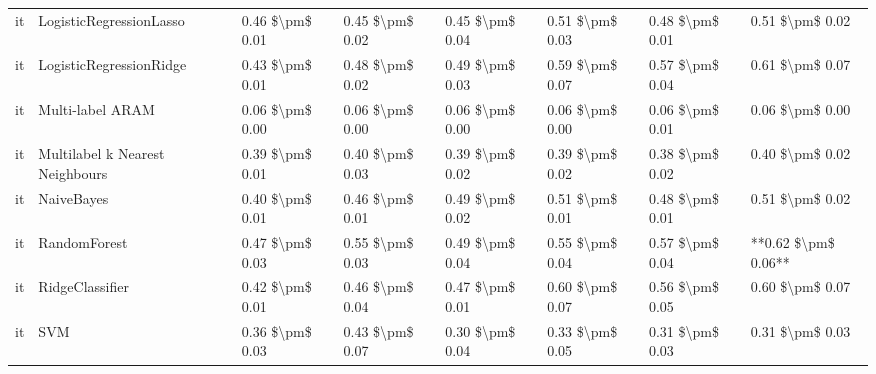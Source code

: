 \begin{tabular}{llllllll}
      it &         LogisticRegressionLasso & 0.46 \$\textbackslash pm\$ 0.01 &           0.45 \$\textbackslash pm\$ 0.02 &       0.45 \$\textbackslash pm\$ 0.04 &        0.51 \$\textbackslash pm\$ 0.03 &                         0.48 \$\textbackslash pm\$ 0.01 &     0.51 \$\textbackslash pm\$ 0.02 \\
      it &         LogisticRegressionRidge & 0.43 \$\textbackslash pm\$ 0.01 &           0.48 \$\textbackslash pm\$ 0.02 &       0.49 \$\textbackslash pm\$ 0.03 &        0.59 \$\textbackslash pm\$ 0.07 &                         0.57 \$\textbackslash pm\$ 0.04 &     0.61 \$\textbackslash pm\$ 0.07 \\
      it &                Multi-label ARAM & 0.06 \$\textbackslash pm\$ 0.00 &           0.06 \$\textbackslash pm\$ 0.00 &       0.06 \$\textbackslash pm\$ 0.00 &        0.06 \$\textbackslash pm\$ 0.00 &                         0.06 \$\textbackslash pm\$ 0.01 &     0.06 \$\textbackslash pm\$ 0.00 \\
      it & Multilabel k Nearest Neighbours & 0.39 \$\textbackslash pm\$ 0.01 &           0.40 \$\textbackslash pm\$ 0.03 &       0.39 \$\textbackslash pm\$ 0.02 &        0.39 \$\textbackslash pm\$ 0.02 &                         0.38 \$\textbackslash pm\$ 0.02 &     0.40 \$\textbackslash pm\$ 0.02 \\
      it &                      NaiveBayes & 0.40 \$\textbackslash pm\$ 0.01 &           0.46 \$\textbackslash pm\$ 0.01 &       0.49 \$\textbackslash pm\$ 0.02 &        0.51 \$\textbackslash pm\$ 0.01 &                         0.48 \$\textbackslash pm\$ 0.01 &     0.51 \$\textbackslash pm\$ 0.02 \\
      it &                    RandomForest & 0.47 \$\textbackslash pm\$ 0.03 &           0.55 \$\textbackslash pm\$ 0.03 &       0.49 \$\textbackslash pm\$ 0.04 &        0.55 \$\textbackslash pm\$ 0.04 &                         0.57 \$\textbackslash pm\$ 0.04 & **0.62 \$\textbackslash pm\$ 0.06** \\
      it &                 RidgeClassifier & 0.42 \$\textbackslash pm\$ 0.01 &           0.46 \$\textbackslash pm\$ 0.04 &       0.47 \$\textbackslash pm\$ 0.01 &        0.60 \$\textbackslash pm\$ 0.07 &                         0.56 \$\textbackslash pm\$ 0.05 &     0.60 \$\textbackslash pm\$ 0.07 \\
      it &                             SVM & 0.36 \$\textbackslash pm\$ 0.03 &           0.43 \$\textbackslash pm\$ 0.07 &       0.30 \$\textbackslash pm\$ 0.04 &        0.33 \$\textbackslash pm\$ 0.05 &                         0.31 \$\textbackslash pm\$ 0.03 &     0.31 \$\textbackslash pm\$ 0.03 \\

\end{tabular}
